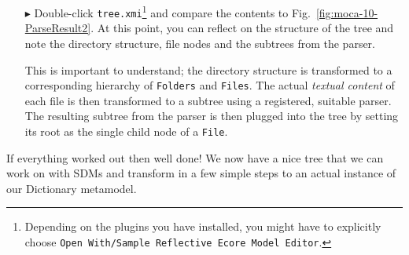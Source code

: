 \begin{enumerate}
  \item[$\blacktriangleright$] Double-click \texttt{tree.xmi}\footnote{Depending on the plugins you have installed, you might have to explicitly choose \texttt{Open With/Sample Reflective Ecore Model Editor}.} and compare the contents to Fig.~\ref{fig:moca-10-ParseResult2}. At this point, you can reflect on the structure of the tree and note the directory structure, file nodes and the subtrees from the parser.
  
This is important to understand; the directory structure is transformed to a corresponding hierarchy of \texttt{Folders} and \texttt{Files}.
The actual \emph{textual content} of each file is then transformed to a subtree using a registered, suitable parser.
The resulting subtree from the parser is then plugged into the tree by setting its root as the single child node of a \texttt{File}.


\end{enumerate}

If everything worked out then well done!  We now have a nice tree that we can work on with SDMs and transform in a few simple steps to an actual instance of our Dictionary metamodel.